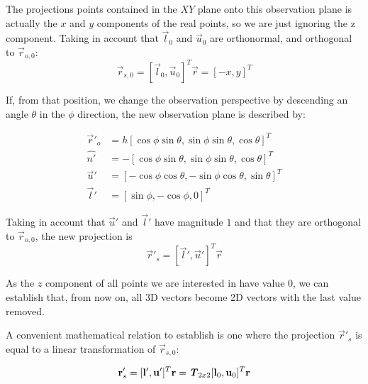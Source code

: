 The projections points contained in the $XY$ plane onto this observation plane is actually the $x$ and $y$ components of the real points, so we are just ignoring the z component. Taking in account that $\vec{l}_0$ and $\vec{u}_0$ are orthonormal, and orthogonal to $\vec{r}_{o,0}$:
\begin{equation}
\vec{r}_{s,0} = [\vec{l}_0, \vec{u}_0]^T \vec{r} = [-x, y]^T
\end{equation}

If, from that position, we change the observation perspective by descending an angle $\theta$ in the $\phi$ direction, the new observation plane is described by:

\begin{equation}
\begin{aligned}
	\vec{r}'_o &= h[\cos\phi\sin\theta, \sin\phi\sin\theta, \cos\theta]^T \\
    \hat{n'} &= -[\cos\phi\sin\theta, \sin\phi\sin\theta, \cos\theta]^T \\
    \vec{u}' &= [-\cos\phi\cos\theta, -\sin\phi\cos\theta, \sin\theta]^T \\
    \vec{l}' &= [\sin\phi, -\cos\phi, 0]^T
\end{aligned}
\end{equation}

Taking in account that $\vec{u}'$ and $\vec{l}'$ have magnitude $1$ and that they are orthogonal to $\vec{r}_{o,0}$, the new projection is
\begin{equation}
\vec{r}'_s = [\vec{l}', \vec{u}']^T \vec{r}
\end{equation}

As the $z$ component of all points we are interested in have value $0$, we can establish that, from now on, all 3D vectors become 2D vectors with the last value removed.

A convenient mathematical relation to establish is one where the projection $\vec{r}'_s$ is equal to a linear transformation of $\vec{r}_{s,0}$:

\begin{equation}
\mathbf{r}'_s = [\mathbf{l}', \mathbf{u}']^T \mathbf{r} = \bm{\mathit{T}}_{2x2} [\mathbf{l}_0, \mathbf{u}_0]^T \mathbf{r}
\end{equation}

